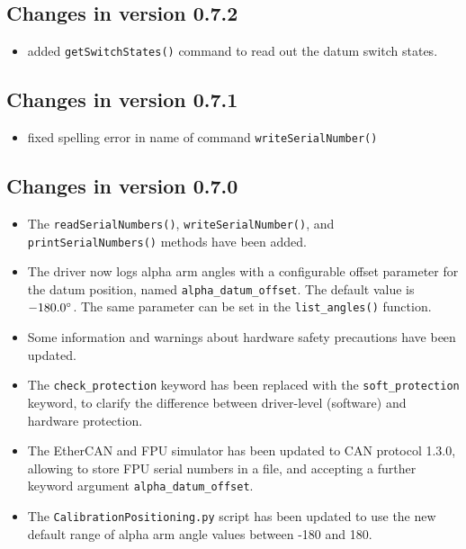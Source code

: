 \documentclass[11pt,a4paper]{scrartcl}
\begin{document}
\subsection*{Changes in version 0.7.2}
\begin{itemize}
\item added \texttt{getSwitchStates()} command to read out
  the datum switch states.  
\end{itemize}


\subsection*{Changes in version 0.7.1}
\begin{itemize}
\item fixed spelling error in name of command \texttt{writeSerialNumber()}
  
\end{itemize}
\subsection*{Changes in version 0.7.0}
\begin{itemize}
\item The \texttt{readSerialNumbers()}, \texttt{writeSerialNumber()},
  and \texttt{printSerialNumbers()} methods have been added.
  
\item The driver now logs alpha arm angles with a configurable offset
  parameter for the datum position, named
  \texttt{alpha\_datum\_offset}. The default value is
  $-180.0\degree$.  The same parameter can be set in the
  \texttt{list\_angles()} function.
  
\item Some information and warnings about hardware safety precautions
  have been updated.
  
\item The \texttt{check\_protection} keyword has been replaced
  with the \texttt{soft\_protection} keyword, to clarify
  the difference between driver-level (software) and
  hardware protection.
  
\item The EtherCAN and FPU simulator has been updated to CAN protocol
  1.3.0, allowing to store FPU serial numbers in a file, and accepting
  a further keyword argument \texttt{alpha\_datum\_offset}.
  
\item The \texttt{CalibrationPositioning.py} script has been updated
  to use the new default range of alpha arm angle values between -180 and 180.
\end{itemize}
\end{document}
